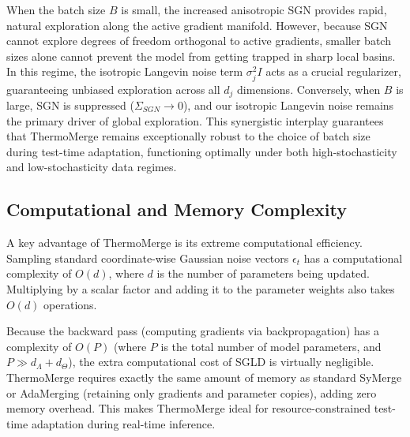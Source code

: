 When the batch size $B$ is small, the increased anisotropic SGN provides rapid, natural exploration along the active gradient manifold.
However, because SGN cannot explore degrees of freedom orthogonal to active gradients, smaller batch sizes alone cannot prevent the model from getting trapped in sharp local basins.
In this regime, the isotropic Langevin noise term $\sigma_j^2 I$ acts as a crucial regularizer, guaranteeing unbiased exploration across all $d_j$ dimensions.
Conversely, when $B$ is large, SGN is suppressed ($\Sigma_{SGN} \to 0$), and our isotropic Langevin noise remains the primary driver of global exploration.
This synergistic interplay guarantees that ThermoMerge remains exceptionally robust to the choice of batch size during test-time adaptation, functioning optimally under both high-stochasticity and low-stochasticity data regimes.

\subsection{Computational and Memory Complexity}
A key advantage of ThermoMerge is its extreme computational efficiency.
Sampling standard coordinate-wise Gaussian noise vectors $\epsilon_t$ has a computational complexity of $O(d)$, where $d$ is the number of parameters being updated.
Multiplying by a scalar factor and adding it to the parameter weights also takes $O(d)$ operations.

Because the backward pass (computing gradients via backpropagation) has a complexity of $O(P)$ (where $P$ is the total number of model parameters, and $P \gg d_{\Lambda} + d_{\Theta}$), the extra computational cost of SGLD is virtually negligible.
ThermoMerge requires exactly the same amount of memory as standard SyMerge or AdaMerging (retaining only gradients and parameter copies), adding zero memory overhead.
This makes ThermoMerge ideal for resource-constrained test-time adaptation during real-time inference.

